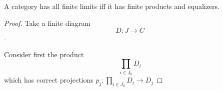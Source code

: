 \documentclass[../../notes.tex]{subfiles}
\begin{document}

  A category has all finite limits iff it has finite products and equalizers.

  \begin{proof}
    Take a finite diagram
    $$ D : {J} \rightarrow C $$.

    Consider first the product
    $$ \prod_{i \in J_0} D_i $$
    which has correct projections $ p_j : \prod_{i \in J_0} D_i \rightarrow D_j  $
    \end{proof}
  
\end{document}
